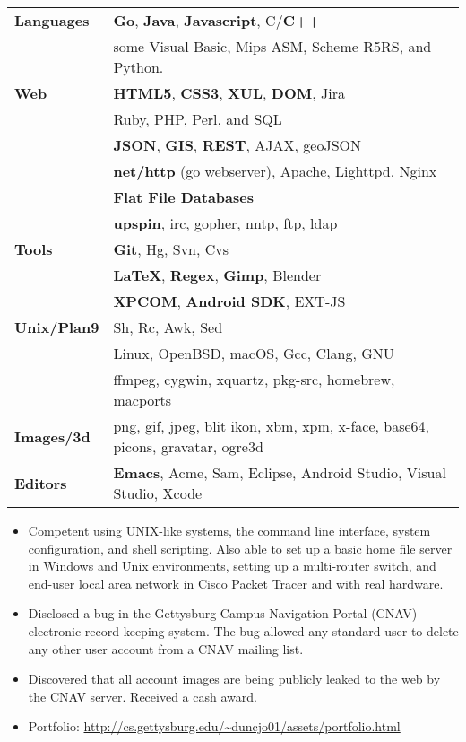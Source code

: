 \documentclass[11pt]{article}
\begin{document}
	\begin{tabular}{ l l }
  	\textbf{Languages} & \textbf{Go}, \textbf{Java}, \textbf{Javascript}, C/\textbf{C++} \\
  	& some Visual Basic, Mips ASM, Scheme R5RS, and Python. \\
  	
  	\textbf{Web} & \textbf{HTML5}, \textbf{CSS3}, \textbf{XUL}, \textbf{DOM}, Jira \\
  	& Ruby, PHP, Perl, and SQL \\
  	& \textbf{JSON}, \textbf{GIS}, \textbf{REST}, AJAX, geoJSON \\
  	& \textbf{net/http} (go webserver), Apache, Lighttpd, Nginx \\
  	& \textbf{Flat File Databases} \\
  	& \textbf{upspin}, irc, gopher, nntp, ftp, ldap \\
  	
  	\textbf{Tools} & \textbf{Git}, Hg, Svn, Cvs \\
  	& \textbf{\LaTeX}, \textbf{Regex}, \textbf{Gimp}, Blender \\
  	& \textbf{XPCOM}, \textbf{Android SDK}, EXT-JS \\
  	
  	\textbf{Unix/Plan9} & Sh, Rc, Awk, Sed \\
  	&Linux, OpenBSD, macOS, Gcc, Clang, GNU \\
  	&ffmpeg, cygwin, xquartz, pkg-src, homebrew, macports \\
  	
  	\textbf{Images/3d} & png, gif, jpeg, blit ikon, xbm, xpm, x-face, base64, picons, gravatar, ogre3d \\
  	
  	\textbf{Editors} & \textbf{Emacs}, Acme, Sam, Eclipse, Android Studio, Visual Studio, Xcode  \\
  	
	\end{tabular}
\begin{itemize}
	\item Competent using UNIX-like systems, the command line interface, system configuration, and shell scripting. Also able to set up a basic home file server in Windows and Unix environments, setting up a multi-router switch, and end-user local area network in Cisco Packet Tracer and with real hardware.
	\item Disclosed a bug in the Gettysburg Campus Navigation Portal (CNAV) electronic record keeping system. The bug allowed any standard user to delete any other user account from a CNAV mailing list.
	\item Discovered that all account images are being publicly leaked to the web by the CNAV server. Received a cash award.
	\item Portfolio: \url{http://cs.gettysburg.edu/~duncjo01/assets/portfolio.html}
\end{itemize}
\end{document}
